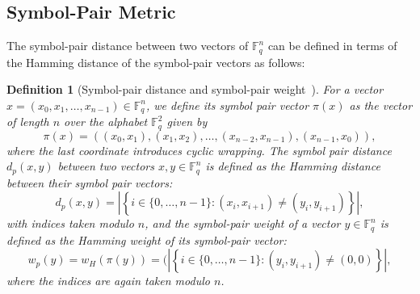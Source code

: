 \documentclass[11pt,draftclsnofoot,journal,onecolumn]{IEEEtran}
\newtheorem{definition}{Definition}
\newtheorem{lemma}{Lemma}
\newtheorem{corollary}{Corollary}
\begin{document}
 \subsection{Symbol-Pair Metric}  
    The symbol-pair distance between two vectors of $\mathbb{F}_q^n$ can be defined in terms of the Hamming distance of the symbol-pair vectors as follows:
    \begin{definition}[Symbol-pair distance and symbol-pair weight~\cite{cassuto2011codes}]\label{def:sym-pair}
     For a vector ${x} = (x_0, x_1, \ldots, x_{n-1}) \in \mathbb{F}_q^n$, we define its \emph{symbol pair vector} $\pi({x})$ as the vector of length $n$ over the alphabet $\mathbb{F}_q^2$ given by
    \[
    \pi({x}) = \left( (x_0, x_1), (x_1, x_2), \ldots, (x_{n-2}, x_{n-1}), (x_{n-1}, x_0) \right),
    \]
    where the last coordinate introduces cyclic wrapping.
    The \emph{symbol pair distance} $d_p({x}, {y})$ between two vectors ${x}, {y} \in \mathbb{F}_q^n$ is defined as the Hamming distance between their symbol pair vectors:
    \[
    d_p({x}, {y}) = \left| \left\{ i \in \{0, \ldots, n-1\} : (x_i, x_{i+1}) \neq (y_i, y_{i+1}) \right\} \right|,
    \]
    with indices taken modulo $n$, and the symbol-pair weight of a vector ${y} \in \mathbb{F}_q^n$ is defined as the Hamming weight of its symbol-pair vector:
    \[
        w_p(y) = w_H(\pi(y)) = (\left| \left\{ i \in \{0, \ldots, n-1\} : (y_i, y_{i+1}) \neq (0,0) \right\} \right|,
    \]
    where the indices are again taken modulo $n$.
    \end{definition}


    
\end{document}
